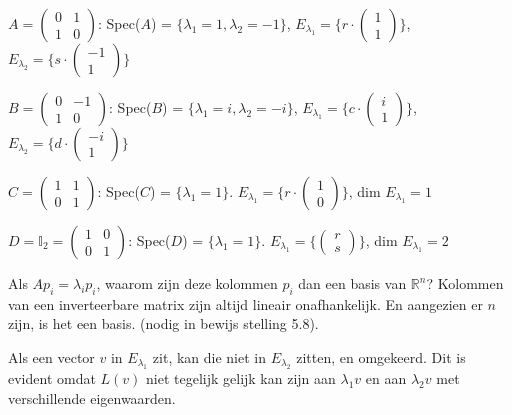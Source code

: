 \documentclass{article}
\begin{document}
$A=\begin{pmatrix} 0&1 \\ 1&0 \end{pmatrix}$: 
  Spec($A$) = $\{\lambda_1=1,\lambda_2=-1\}$,
  $E_{\lambda_1}=\{ r \cdot \begin{pmatrix} 1\\ 1 \end{pmatrix}  \}$, 
  $E_{\lambda_2}=\{ s \cdot \begin{pmatrix} -1\\ 1 \end{pmatrix}  \}$

$B=\begin{pmatrix} 0&-1 \\ 1&0 \end{pmatrix}$: 
  Spec($B$) = $\{  \lambda_1=i,  \lambda_2=-i \}$,  
  $E_{\lambda_1} = \{ c \cdot \begin{pmatrix} i\\ 1 \end{pmatrix}  \}$, 
  $E_{\lambda_2} = \{ d \cdot \begin{pmatrix} -i\\ 1 \end{pmatrix}  \}   $


$C=\begin{pmatrix} 1&1 \\ 0&1 \end{pmatrix}$: 
  Spec($C$) = $\{ \lambda_1=1 \}$. 
  $E_{\lambda_1} = \{ r \cdot \begin{pmatrix} 1\\ 0 \end{pmatrix}  \}$, dim $E_{\lambda_1}=1$ 
  
$D= \mathbb{I}_2 = \begin{pmatrix} 1&0 \\ 0&1 \end{pmatrix}$: 
  Spec($D$) = $\{ \lambda_1=1 \}$. 
  $E_{\lambda_1} = \{ \begin{pmatrix} r\\ s \end{pmatrix}  \}$, dim $E_{\lambda_1} = 2 $



Als $Ap_i = \lambda_i p_i$, waarom zijn deze kolommen $p_i$ dan een basis van $\mathbb{R}^n$? Kolommen van een inverteerbare matrix zijn altijd lineair onafhankelijk. En aangezien er $n$ zijn, is het een basis. (nodig in bewijs stelling 5.8). 

Als een vector $v$ in $E_{\lambda_1}$ zit, kan die niet in $E_{\lambda_2}$ zitten, en omgekeerd. Dit is evident omdat $L(v)$ niet tegelijk gelijk kan zijn aan $\lambda_1 v$ en aan $\lambda_2 v$ met verschillende eigenwaarden. 
\end{document}
